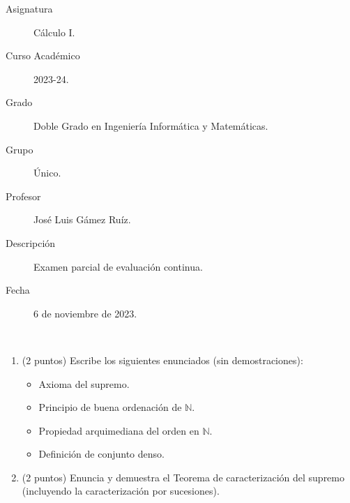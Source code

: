 \documentclass[12pt]{article}
\begin{document}

    
    

    \begin{description}
        \item[Asignatura] Cálculo I.
        \item[Curso Académico] 2023-24.
        \item[Grado] Doble Grado en Ingeniería Informática y Matemáticas.
        \item[Grupo] Único.
        \item[Profesor] José Luis Gámez Ruíz.
        \item[Descripción] Examen parcial de evaluación continua.
        \item[Fecha] 6 de noviembre de 2023.
    
    \end{description}
    \newpage
    

    \begin{ejercicio}~
        \begin{enumerate}
            \item (2 puntos) Escribe los siguientes enunciados (sin demostraciones):
            \begin{itemize}
                \item Axioma del supremo.
                \item Principio de buena ordenación de $\mathbb{N}$.
                \item Propiedad arquimediana del orden en $\mathbb{N}$.
                \item Definición de conjunto denso.
            \end{itemize}
            \item (2 puntos) Enuncia y demuestra el Teorema de caracterización del supremo (incluyendo la caracterización por sucesiones).
        \end{enumerate}
    \end{ejercicio}
        
\end{document}
